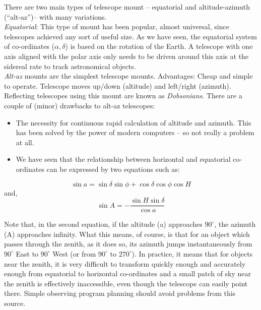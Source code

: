 \documentclass[a4paper,12pt]{extarticle}
\begin{document}
There are two main types of telescope mount – equatorial and altitude-azimuth (``alt-az'')– with many variations.\\

\textit{Equatorial}: This type of mount has been popular, almost universal, since telescopes achieved any sort of useful size. As we have seen, the equatorial system of co-ordinates ($\alpha, \delta$) is based on the rotation of the Earth. A telescope with one axis aligned with the polar axis only needs to be driven around this axis at the sidereal rate to track astronomical objects.\\

\textit{Alt-az} mounts are the simplest telescope mounts. Advantages: Cheap and simple to operate.
Telescope moves up/down (altitude) and left/right
(azimuth). Reflecting telescopes using this mount are known as \textit{Dobsonians}. There are a couple of (minor) drawbacks to alt-az telescopes:

\begin{itemize}
	\item The necessity for continuous rapid calculation of altitude and azimuth. This has been solved by the power of modern computers – so not really a problem at all.
	\item We have seen that the relationship between horizontal and equatorial co-ordinates can be expressed by two equations such as:
\end{itemize}
\[\sin a=\sin \delta \sin \phi+\cos \delta \cos \phi \cos H\]
and,
\[\sin A=-\frac{\sin H \sin \delta}{\cos a}\]

Note that, in the second equation, if the altitude (a) approaches $90^\circ$, the azimuth (A) approaches infinity. What this means, of course, is that for an object which passes through the zenith, as it does so, its azimuth jumps instantaneously from $90^\circ$ East to $90^\circ$ West (or from $90^\circ$ to $270^\circ$). In practice, it means that for objects near the zenith, it is very difficult to transform quickly enough and accurately enough from equatorial to horizontal co-ordinates and a small patch of sky near the zenith is effectively inaccessible, even though the telescope can easily point there. Simple observing program planning should avoid problems from this source.\\
\end{document}
